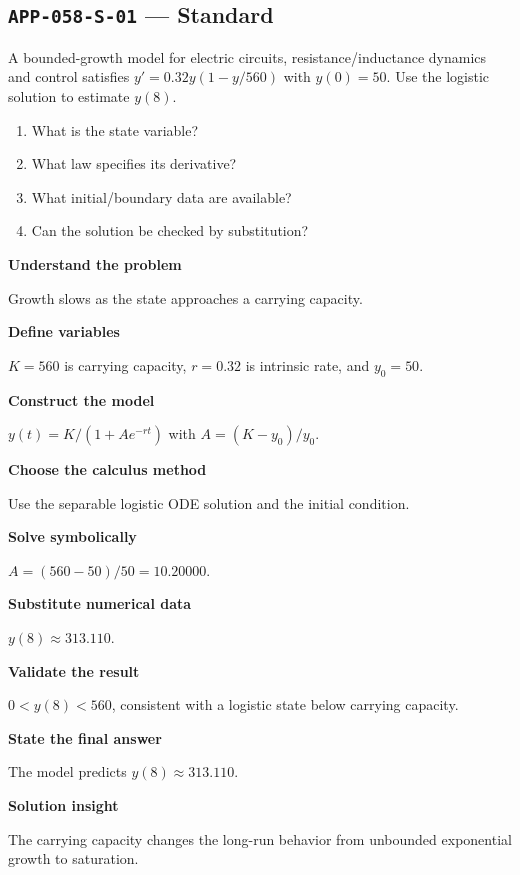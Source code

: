 \documentclass[11pt]{book}
\newcommand{\pid}[1]{\texttt{#1}}
\begin{document}
\subsection*{\pid{APP-058-S-01} — Standard}
\begin{problembox}
A bounded-growth model for electric circuits, resistance/inductance dynamics and control satisfies $y'=0.32y(1-y/560)$ with $y(0)=50$. Use the logistic solution to estimate $y(8)$.
\end{problembox}
\begin{promptbox}\begin{enumerate}
\item What is the state variable?
\item What law specifies its derivative?
\item What initial/boundary data are available?
\item Can the solution be checked by substitution?
\end{enumerate}\end{promptbox}
\begin{solutionbox}
\textbf{Understand the problem}\par Growth slows as the state approaches a carrying capacity.\par\medskip
\textbf{Define variables}\par $K=560$ is carrying capacity, $r=0.32$ is intrinsic rate, and $y_0=50$.\par\medskip
\textbf{Construct the model}\par $y(t)=K/(1+A e^{-rt})$ with $A=(K-y_0)/y_0$.\par\medskip
\textbf{Choose the calculus method}\par Use the separable logistic ODE solution and the initial condition.\par\medskip
\textbf{Solve symbolically}\par $A=(560-50)/50=10.20000$.\par\medskip
\textbf{Substitute numerical data}\par $y(8)\approx 313.110$.\par\medskip
\textbf{Validate the result}\par $0<y(8)<560$, consistent with a logistic state below carrying capacity.\par\medskip
\textbf{State the final answer}\par The model predicts $y(8)\approx 313.110$.\par\medskip
\textbf{Solution insight}\par The carrying capacity changes the long-run behavior from unbounded exponential growth to saturation.\par\medskip
\end{solutionbox}
\end{document}
